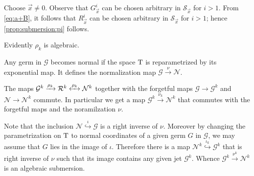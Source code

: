 \documentclass[a4paper,10pt]{article}
\begin{document}
Choose $\vec x\ne 0$.
Observe that $G^i_\vec x$ can be chosen arbitrary in $\mathcal{S}_\vec x$ for $i>1$.
From \ref{eq:a+B}, it follows that $R^i_\vec x$ can be chosen arbitrary in $\mathcal{S}_\vec x$ for $i>1$;
hence \ref{prop:submersion:pi} follows.
\qeds

\begin{wrapfigure}{r}{34mm}
\vskip-4mm
\centering
{}
\label{diagram-page}
\end{wrapfigure}

Evidently $\rho_k$ is algebraic.

Any germ in $\mathcal{G}$ becomes normal if the space $\mathrm{T}$ is reparametrized by its exponential map.
It defines the normalization map 
$\mathcal{G}\xrightarrow{\nu} \mathcal{N}$.

The maps $\mathcal{G}^k\xrightarrow{\rho_k}\mathcal{R}^k\z{\xleftrightarrow{\rho_k}}\mathcal{N}^k$ together with the forgetful maps $\mathcal{G}\to\mathcal{G}^k$ and $\mathcal{N}\to\mathcal{N}^k$  commute.
In particular we get a map $\mathcal{G}^k\xrightarrow{\nu_k}\mathcal{N}^k$ that commutes with the forgetful maps and the noramilzation $\nu$.

Note that the inclusion $\mathcal{N}\stackrel{\iota}{\hookrightarrow} \mathcal{G}$ is a right inverse of $\nu$.
Moreover by changing the parametrization on $\mathrm{T}$ to normal coordinates of a given germ $G$ in $\mathcal{G}$, we may assume that $G$ lies in the image of $\iota$.
Therefore there is a map $\mathcal{N}^k\stackrel{\iota_k}{\hookrightarrow} \mathcal{G}^k$ that is right inverse of $\nu$ such that its image contains any given jet $\mathcal{G}^k$.
Whence $\mathcal{G}^k\xrightarrow{\nu^k} \mathcal{N}^k$ is an algebraic submersion.
\end{document}
